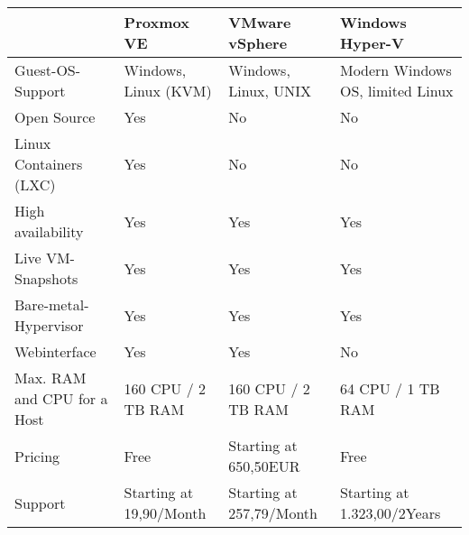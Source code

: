 \begin{table}[h]
    \begin{tabular}{llll}
    ~                           & Proxmox VE           & VMware vSphere       & Windows Hyper-V                  \\ \hline
    Guest-OS-Support            & Windows, Linux (KVM) & Windows, Linux, UNIX & Modern Windows OS, limited Linux \\
    Open Source                 & Yes                   & No                 & No                             \\
    Linux Containers (LXC)      & Yes                   & No                 & No                             \\
    High availability           & Yes                   & Yes                   & Yes                               \\
    Live VM-Snapshots           & Yes                   & Yes                   & Yes                               \\
    Bare-metal-Hypervisor       & Yes                   & Yes                   & Yes                               \\
    Webinterface                & Yes                   & Yes                   & No                             \\
    Max. RAM and CPU for a Host & 160 CPU / 2 TB RAM   & 160 CPU / 2 TB RAM   & 64 CPU / 1 TB RAM                \\
    Pricing                     & Free               & Starting at 650,50EUR  & Free                             \\
    Support                     & Starting at 19,90/Month           & Starting at 257,79/Month    & Starting at 1.323,00/2Years \\
    \end{tabular}
\end{table}
